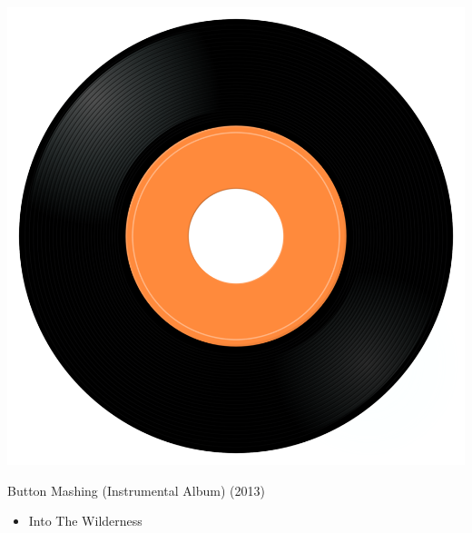 \begin{minipage}[t]{0.25\textwidth}\vspace{0pt}
	\captionsetup{type=figure}
	\includegraphics[width=\textwidth]{Images/cover.png}
	\caption*{Button Mashing (Instrumental Album) (2013)}
\end{minipage}
\begin{minipage}[t]{0.25\textwidth}\vspace{0pt}
	\begin{itemize}[nosep,leftmargin=1em,labelwidth=*,align=left]
		\setlength{\itemsep}{0pt}
		\item Into The Wilderness
	\end{itemize}
\end{minipage}
